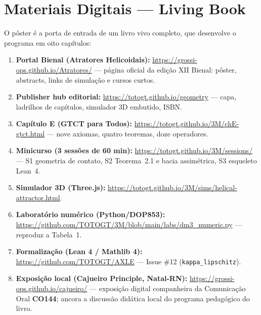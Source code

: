 \documentclass[11pt,a4paper]{article}
\theoremstyle{plain}
\begin{document}
\small
\section*{Materiais Digitais — Living Book}
O pôster é a porta de entrada de um livro vivo completo, que desenvolve o programa em oito capítulos:
\begin{enumerate}
  \item \textbf{Portal Bienal (Atratores Helicoidais):} \url{https://grossi-ops.github.io/Atratores/}
        — página oficial da edição XII Bienal: pôster, abstracts, links de simulação e cursos curtos.
  \item \textbf{Publisher hub editorial:} \url{https://totogt.github.io/geometry} — capa, ladrilhos de
        capítulos, simulador 3D embutido, ISBN.
  \item \textbf{Capítulo E (GTCT para Todos):} \url{https://totogt.github.io/3M/chE-gtct.html} —
        nove axiomas, quatro teoremas, doze operadores.
  \item \textbf{Minicurso (3 sessões de 60 min):} \url{https://totogt.github.io/3M/sessions/} —
        S1 geometria de contato, S2 Teorema~2.1 e bacia assimétrica, S3 esqueleto Lean~4.
  \item \textbf{Simulador 3D (Three.js):} \url{https://totogt.github.io/3M/sims/helical-attractor.html}.
  \item \textbf{Laboratório numérico (Python/DOP853):}
        \url{https://github.com/TOTOGT/3M/blob/main/labs/dm3_numeric.py} — reproduz a Tabela~1.
  \item \textbf{Formalização (Lean 4 / Mathlib 4):} \url{https://github.com/TOTOGT/AXLE} —
        Issue \#12 (\texttt{kappa\_lipschitz}).
  \item \textbf{Exposição local (Cajueiro Principle, Natal-RN):}
        \url{https://grossi-ops.github.io/cajueiro/} — exposição digital companheira da Comunicação
        Oral \textbf{CO144}; ancora a discussão didática local do programa pedagógico do livro.
\end{enumerate}

\end{document}
